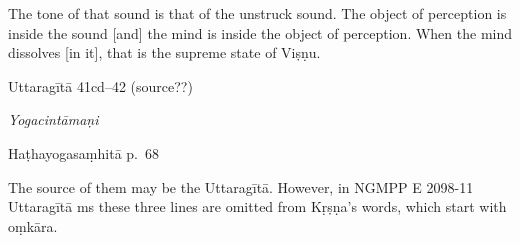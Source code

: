 \begin{ekdosis}
\begin{translation}[hp04_049]
The tone of that sound is that of the unstruck sound. The object of perception is inside the sound [and] the mind is inside the object of perception. When the mind dissolves [in it], that is the supreme state of Viṣṇu.
\end{translation}


\begin{sources}[hp04_049]
Uttaragītā 41cd–42 (source??)
\begin{versinnote}
\end{versinnote}
\end{sources}

\begin{testimonia}[hp04_049]
\emph{Yogacintāmaṇi}
\begin{versinnote}
\end{versinnote}

Haṭhayogasaṃhitā p.~68
\begin{versinnote}
\end{versinnote}
\end{testimonia}

\begin{philcomm}[hp04_049]
\begin{versinnote}
\end{versinnote}
The source of them may be the Uttaragītā. However, in NGMPP E 2098-11 Uttaragītā ms these three lines are omitted from Kṛṣṇa's words, which start with oṃkāra.


\end{philcomm}
\end{ekdosis}

